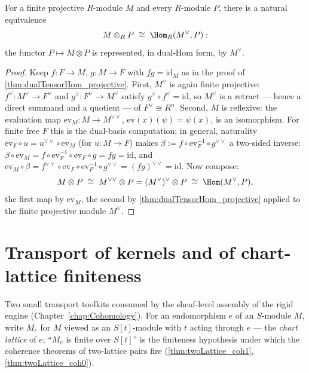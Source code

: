 \begin{theorem}
  \label{thm:tensorDualHom_projective}
  \leanok
  For a finite projective \(R\)-module \(M\) and every \(R\)-module \(P\), there is a
  natural equivalence
  \[
    M \otimes_R P \;\cong\; \Hom_R(M^{\vee}, P) :
  \]
  the functor \(P \mapsto M \otimes P\) is represented, in dual-Hom form, by
  \(M^{\vee}\).
\end{theorem}
\begin{proof}
  \leanok
  Keep \(f : F \to M\), \(g : M \to F\) with \(f g = \mathrm{id}_M\) as in the proof of
  \ref{thm:dualTensorHom_projective}. First, \(M^{\vee}\) is again finite projective:
  \(f^{\vee} : M^{\vee} \to F^{\vee}\) and \(g^{\vee} : F^{\vee} \to M^{\vee}\) satisfy
  \(g^{\vee} \circ f^{\vee} = \mathrm{id}\), so \(M^{\vee}\) is a retract --- hence a
  direct summand and a quotient --- of \(F^{\vee} \cong R^n\). Second, \(M\) is
  reflexive: the evaluation map \(\mathrm{ev}_M : M \to M^{\vee\vee}\),
  \(\mathrm{ev}(x)(\psi) = \psi(x)\), is an isomorphism. For finite free \(F\) this is
  the dual-basis computation; in general, naturality
  \(\mathrm{ev}_F \circ u = u^{\vee\vee} \circ \mathrm{ev}_M\) (for \(u : M \to F\))
  makes \(\beta := f \circ \mathrm{ev}_F^{-1} \circ g^{\vee\vee}\) a two-sided inverse:
  \(\beta \circ \mathrm{ev}_M = f \circ \mathrm{ev}_F^{-1} \circ \mathrm{ev}_F \circ g
  = f g = \mathrm{id}\), and \(\mathrm{ev}_M \circ \beta = f^{\vee\vee} \circ
  \mathrm{ev}_F \circ \mathrm{ev}_F^{-1} \circ g^{\vee\vee} = (f g)^{\vee\vee} =
  \mathrm{id}\). Now compose:
  \[
    M \otimes P \;\cong\; M^{\vee\vee} \otimes P
      = (M^{\vee})^{\vee} \otimes P \;\cong\; \Hom(M^{\vee}, P),
  \]
  the first map by \(\mathrm{ev}_M\), the second by
  \ref{thm:dualTensorHom_projective} applied to the finite projective module
  \(M^{\vee}\).
\end{proof}

\section{Transport of kernels and of chart-lattice finiteness}
\label{sec:aeval_transport}

Two small transport toolkits consumed by the sheaf-level assembly of the rigid engine
(Chapter~\ref{chap:Cohomology}). For an endomorphism \(e\) of an \(S\)-module \(M\),
write \(M_e\) for \(M\) viewed as an \(S[t]\)-module with \(t\) acting through \(e\) ---
the \emph{chart lattice} of \(e\); ``\(M_e\) is finite over \(S[t]\)'' is the finiteness
hypothesis under which the coherence theorems of two-lattice pairs fire
(\ref{thm:twoLattice_coh1}, \ref{thm:twoLattice_coh0}).

